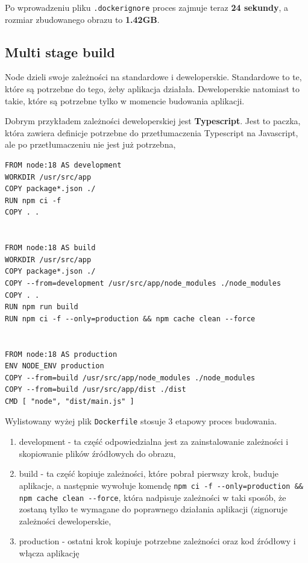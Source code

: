 \documentclass{article}
\begin{document}
Po wprowadzeniu pliku \lstinline|.dockerignore| proces zajmuje teraz \textbf{24 sekundy}, a rozmiar zbudowanego obrazu to \textbf{1.42GB}.

\subsection{Multi stage build}

Node dzieli swoje zależności na standardowe i deweloperskie. Standardowe to te, które są potrzebne do tego, żeby aplikacja działała. Deweloperskie natomiast to takie, które są potrzebne tylko w momencie budowania aplikacji.

Dobrym przykładem zależności deweloperskiej jest \textbf{Typescript}. Jest to paczka, która zawiera definicje potrzebne do przetłumaczenia Typescript na Javascript, ale po przetłumaczeniu nie jest już potrzebna,

\begin{lstlisting}[caption=Multistage plik Dockerfile]
FROM node:18 AS development
WORKDIR /usr/src/app
COPY package*.json ./
RUN npm ci -f
COPY . .


FROM node:18 AS build
WORKDIR /usr/src/app
COPY package*.json ./
COPY --from=development /usr/src/app/node_modules ./node_modules
COPY . .
RUN npm run build
RUN npm ci -f --only=production && npm cache clean --force


FROM node:18 AS production
ENV NODE_ENV production
COPY --from=build /usr/src/app/node_modules ./node_modules
COPY --from=build /usr/src/app/dist ./dist
CMD [ "node", "dist/main.js" ]
\end{lstlisting}

Wylistowany wyżej plik \lstinline|Dockerfile| stosuje 3 etapowy proces budowania.

\begin{enumerate}
    \item development - ta część odpowiedzialna jest za zainstalowanie zależności i skopiowanie plików źródłowych do obrazu,
    \item build - ta część kopiuje zależności, które pobrał pierwszy krok, buduje aplikacje, a następnie wywołuje komendę \lstinline|npm ci -f --only=production && npm cache clean --force|, która nadpisuje zależności w taki sposób, że zostaną tylko te wymagane do poprawnego działania aplikacji (zignoruje zależności deweloperskie,
    \item production - ostatni krok kopiuje potrzebne zależności oraz kod źródłowy i włącza aplikację
\end{enumerate}
\end{document}
